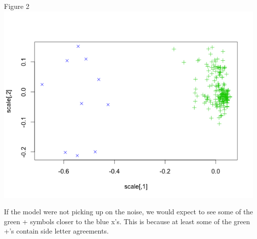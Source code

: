 \begin{center}
Figure 2\\
\includegraphics[width=\linewidth]{Rplot.png}
\end{center}

If the model were not picking up on the noise, we would expect to see some of the green + symbols closer to the blue x's. This is because at least some of the green +'s contain side letter agreements. 